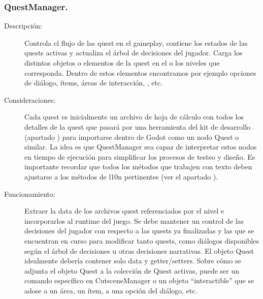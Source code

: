 \subsubsection{QuestManager.}\label{modelado:questmanager}
\begin{description}
	\item[Descripción:] Controla el flujo de las quest en el gameplay, contiene los estados de las quests activas y actualiza el árbol de decisiones del jugador. Carga los distintos objetos o elementos de la quest en el o los niveles que corresponda. Dentro de estos elementos encontramos por ejemplo opciones de diálogo, ítems, áreas de interacción, , etc.
	
	\item[Consideraciones:] Cada quest es inicialmente un archivo de hoja de cálculo con todos los detalles de la quest que pasará por una herramienta del kit de desarrollo (apartado ) para importarse dentro de Godot como un nodo Quest o similar. La idea es que QuestManager sea capaz de interpretar estos nodos en tiempo de ejecución para simplificar los procesos de testeo y diseño. Es importante recordar que todos los métodos que trabajen con texto deben ajustarse a los métodos de l10n pertinentes (ver el apartado ).
	
	\item[Funcionamiento:] Extraer la data de los archivos quest referenciados por el nivel e incorporarlos al runtime del juego. Se debe mantener un control de las decisiones del jugador con respecto a las quests ya finalizadas y las que se encuentran en curso para modificar tanto quests, como diálogos disponibles según el árbol de decisiones u otras decisiones narrativas. El objeto Quest idealmente debería contener solo data y getter/setters.
	Sobre cómo se adjunta el objeto Quest a la colección de Quest activas, puede ser un comando específico en CutsceneManager o un objeto “interactible” que se adose a un área, un ítem, a una opción del diálogo, etc.
\end{description}
	
